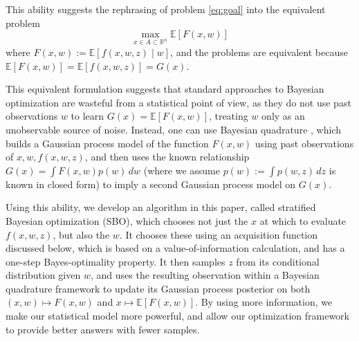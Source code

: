 \documentclass{article}
\newcommand{\w}{w}
\newcommand{\z}{z}
\newcommand{\pfcomment}[1]{{\color{red} PF: #1}}
\begin{document}
This ability suggests the rephrasing of problem \eqref{eq:goal} into the equivalent problem
\begin{equation}
\max_{x\in A\subset\mathbb{R}^{n}}\mathbb{E}\left[F\left(x,\w\right)\right]
\label{eq:strata}
\end{equation} 
where $F\left(x,\w\right):=\mathbb{E}\left[f\left(x,\w,\z\right)\mid \w\right]$,
and the problems are equivalent because $\mathbb{E}[F(x,\w)]=\mathbb{E}\left[f\left(x,\w,\z\right)\right] = G(x)$.


This equivalent formulation suggests that standard approaches to Bayesian optimization are wasteful from a statistical point of view, as they do not use past observations $\w$ to learn $G(x) = \mathbb{E}[F(x,\w)]$, treating $\w$ only as an unobservable source of noise.  Instead, one can use Bayesian quadrature \cite{o1991bayes}, which builds a Gaussian process model of the function $F(x,\w)$ using past observations of $x,\w,f(x,\w,\z)$, and then uses the known relationship $G(x) = \int F(x,w) p(w)\,dw$ (where we assume $p(w):=\int p(\w,\z)\,d\z$ is known in closed form) to imply a second Gaussian process model on $G(x)$.

Using this ability, we develop an algorithm in this paper, called stratified Bayesian optimization (SBO), which chooses not just the $x$ at which to evaluate $f(x,\w,\z)$, but also the $\w$.  It chooses these using an acquisition function discussed below, which is based on a value-of-information \cite{Ho66} calculation, and has a one-step Bayes-optimality property.  It then samples $\z$ from its conditional distribution given $\w$, and uses the resulting observation within a Bayesian quadrature framework to update its Gaussian process posterior on both $(x,\w)\mapsto F(x,\w)$ and $x\mapsto \mathbb{E}[F(x,\w)]$.  By using more information, we make our statistical model more powerful, and allow our optimization framework to provide better answers with fewer samples.
\end{document}
